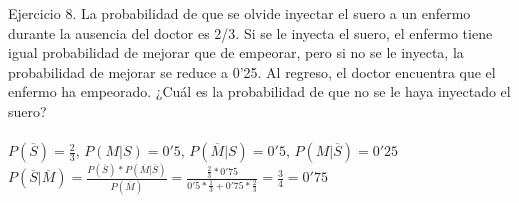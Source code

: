 \documentclass{article}
\begin{document}
Ejercicio 8. La probabilidad de que se olvide inyectar el suero a un enfermo durante la ausencia del doctor es 2/3. Si se le inyecta el suero, el enfermo tiene igual probabilidad de mejorar que de empeorar, pero si no se le inyecta, la probabilidad de mejorar se reduce a 0'25. Al regreso, el doctor encuentra que el enfermo ha empeorado. ¿Cuál es la probabilidad de que no se le haya inyectado el suero? \\ \\
$P(\overline{S}) = \frac{2}{3}$, $P(M|S) = 0'5$, $P(\overline{M}|S) = 0'5$, $P(M|\overline{S}) = 0'25$ \\ 
$P(\overline{S}|\overline{M}) = \frac{P(\overline{S})*P(\overline{M}|\overline{S})}{P(\overline{M})} = \frac{\frac{2}{3}*0'75}{0'5*\frac{1}{3}+0'75*\frac{2}{3}}= \frac{3}{4} = 0'75$
\end{document}
